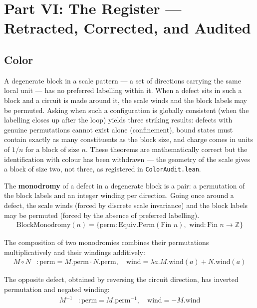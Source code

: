 \section{Part VI: The Register — Retracted, Corrected, and Audited}

\subsection{Color}

A degenerate block in a scale pattern — a set of directions carrying the same local unit — has no preferred labelling within it.  When a defect sits in such a block and a circuit is made around it, the scale winds and the block labels may be permuted.  Asking when such a configuration is globally consistent (when the labelling closes up after the loop) yields three striking results: defects with genuine permutations cannot exist alone (confinement), bound states must contain exactly as many constituents as the block size, and charge comes in units of $1/n$ for a block of size $n$.  These theorems are mathematically correct but the identification with colour has been withdrawn — the geometry of the scale gives a block of size two, not three, as registered in \texttt{ColorAudit.lean}.

\begin{definition}
The \textbf{monodromy} of a defect in a degenerate block is a pair: a permutation of the block labels and an integer winding per direction.  Going once around a defect, the scale winds (forced by discrete scale invariance) and the block labels may be permuted (forced by the absence of preferred labelling).
\begin{align*}
\text{BlockMonodromy}(n) = \{\text{perm} : \text{Equiv.Perm}(\text{Fin } n), \text{ wind} : \text{Fin } n \to \mathbb{Z}\}
\end{align*}
\end{definition}

\begin{definition}
The composition of two monodromies combines their permutations multiplicatively and their windings additively:
\begin{align*}
M \circ N &: \text{perm} = M.\text{perm} \cdot N.\text{perm}, \quad \text{wind} = \lambda a. M.\text{wind}(a) + N.\text{wind}(a)
\end{align*}
\end{definition}

\begin{definition}
The opposite defect, obtained by reversing the circuit direction, has inverted permutation and negated winding:
\begin{align*}
M^{-1} &: \text{perm} = M.\text{perm}^{-1}, \quad \text{wind} = -M.\text{wind}
\end{align*}
\end{definition}

